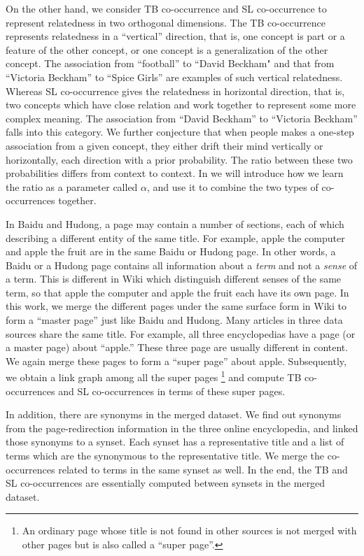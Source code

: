 On the other hand, we consider TB co-occurrence and SL co-occurrence
to represent relatedness in two orthogonal dimensions.
The TB co-occurrence represents relatedness in a ``vertical'' direction,
that is, one concept is part or a feature of the other concept,
or one concept is a generalization of the other concept.
The association from ``football'' to
``David Beckham" and that from ``Victoria Beckham'' to ``Spice Girls''
are examples of such vertical relatedness.
Whereas SL co-occurrence gives the relatedness in horizontal direction,
that is,  two concepts which have close relation and work together to
represent some more complex meaning.
The association from ``David Beckham'' to ``Victoria Beckham'' falls
into this category.
We further conjecture that when people makes a one-step association
from a given concept, they either drift their mind vertically or horizontally,
each direction with a prior probability. The ratio between these two
probabilities differs from context to context.
In  we will introduce how we learn the ratio
as a parameter called $\alpha$, and use it to combine the
two types of co-occurrences together.

In Baidu and Hudong, a page may contain a number of sections, each of
which describing a different entity of the same title. For example,
apple the computer and apple the fruit are in the same Baidu or Hudong page.
In other words, a Baidu or a Hudong page contains all information
about a {\em term} and not a {\em sense} of a term. This is different in
Wiki which distinguish different senses of the same term, so that
apple the computer and apple the fruit each have its own page.
In this work, we merge the different pages under the same surface form in Wiki
to form a ``master page'' just like Baidu and Hudong.
Many articles in three data sources share the same title.
For example, all three encyclopedias have a page (or a master page)
about ``apple.'' These three page are usually different in content.
We again merge these pages to form a ``super page'' about apple.
Subsequently, we obtain a link graph among all the super pages \footnote{An
ordinary page whose title is not found in other sources is not merged
with other pages but is also called a ``super page''.}
and compute TB co-occurrences and SL co-occurrences in terms of these
super pages.

In addition, there are synonyms in the merged dataset.
We find out synonyms from the page-redirection information
in the three online encyclopedia, and linked those synonyms to a synset.
Each synset has a representative title
and a list of terms which are the synonymous to the representative title.
We merge the co-occurrences related to terms in the same synset as well.
In the end, the TB and SL co-occurrences are essentially computed between
synsets in the merged dataset.

